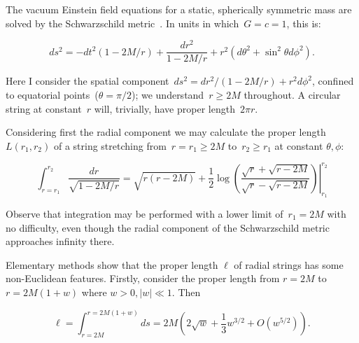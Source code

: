 \documentclass{ws-tpe}
\begin{document}
The vacuum Einstein field equations for a static, spherically
symmetric mass are solved by the Schwarzschild
metric~\cite{schwarzschild1916}.  In units in which~$G=c=1$, this is:

\begin{equation}\label{schwarzschild}
ds^2= -dt^2\left(1-2M/r\right) +\frac{dr^2}{1-2M/r} + r^2\left(d\theta^2 + \sin^2\theta d\phi^2\right).
\end{equation}

\noindent Here I consider the spatial component~$ds^2=
dr^2/\left(1-2M/r\right) + r^2d\phi^2$, confined to equatorial
points~($\theta=\pi/2$); we understand~$r\geqslant 2M$ throughout.  A
circular string at constant~$r$ will, trivially, have proper
length~$2\pi r$.

Considering first the radial component we may calculate the
proper length $L\left(r_1,r_2\right)$ of a string stretching
from~$r=r_1\geqslant 2M$ to~$r_2\geqslant r_1$ at constant $\theta,\phi$:



\begin{equation}\label{radial_string_length}
  \int_{r=r_1}^{r_2}\frac{dr}{\sqrt{1-2M/r}}=
  \left.
  \sqrt{r(r-2M)} +\frac{1}{2}\log\left(
  \frac{\sqrt{r}+\sqrt{r-2M}}{\sqrt{r}-\sqrt{r-2M}}\right)
  \right|_{r_1}^{r_2}
  \end{equation}

Observe that integration may be performed with a lower limit
of~$r_1=2M$ with no difficulty, even though the radial component of the
Schwarzschild metric approaches infinity there.

Elementary methods show that the proper length $\ell$ of radial
strings has some non-Euclidean features.  Firstly, consider the proper
length from $r=2M$ to $r=2M(1+w)$ where $w>0, \left|w\right|\ll 1$.
Then


 \begin{equation}\label{ell}
   \ell =
   \int_{r=2M}^{r=2M(1+w)}ds
   =2M\left(2\sqrt{w} + \frac{1}{3}w^{3/2} + O(w^{5/2})\right).
 \end{equation}
\end{document}
